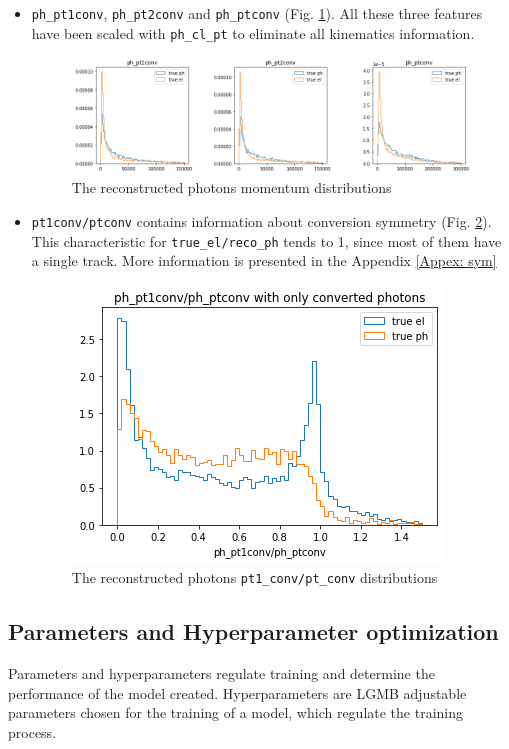 \documentclass[a4paper, oneside]{book}
\begin{document}
\begin{itemize}
						\item \texttt{ph\_pt1conv}, \texttt{ph\_pt2conv} and \texttt{ph\_ptconv} (Fig. \ref{fig: ph_pts}). All these three features have been scaled with \texttt{ph\_cl\_pt} to eliminate all kinematics information. 
						
						\begin{figure}[h!]	
							\centering
							\includegraphics[width=1.\linewidth]{tesi_images/ph_pts.png} 
							\caption{The reconstructed photons momentum distributions} 
							\label{fig: ph_pts}
						\end{figure}
						
						\item \texttt{pt1conv/ptconv} contains information about conversion symmetry (Fig. \ref{fig: pt1_pt}). This characteristic for \texttt{true\_el/reco\_ph} tends to 1, since most of them have a single track. More information is presented in the Appendix \ref{Appex: sym}
						
						\begin{figure}[h!]	
							\centering
							\includegraphics[width=.5\linewidth]{tesi_images/pt1_pt.png} 
							\caption{The reconstructed photons \texttt{pt1\_conv/pt\_conv} distributions} 
							\label{fig: pt1_pt}
						\end{figure}
					\end{itemize}
				
			\subsection{Parameters and Hyperparameter optimization}
				Parameters and hyperparameters regulate training and determine the performance of the model created. Hyperparameters are LGMB \cite{LGBM} adjustable parameters chosen for the training of a model, which regulate the training process. 
				
\end{document}
